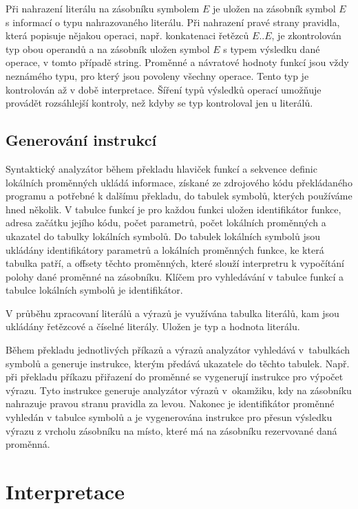 \documentclass[a4paper,11pt,titlepage]{article}
\begin{document}
Při nahrazení literálu na zásobníku symbolem $E$ je uložen na zásobník symbol $E$ s informací o typu nahrazovaného literálu.
Při nahrazení pravé strany pravidla, která popisuje nějakou operaci, např. konkatenaci řetězců $E .. E$, je zkontrolován typ obou operandů a na zásobník uložen symbol $E$ s typem výsledku dané operace, v tomto případě string. Proměnné a návratové hodnoty funkcí jsou vždy neznámého typu, pro který jsou povoleny všechny operace. Tento typ je kontrolován až v době interpretace. Šíření typů výsledků operací umožňuje provádět rozsáhlejší kontroly, než kdyby se typ kontroloval jen u literálů.

\subsection{Generování instrukcí}

Syntaktický analyzátor během překladu hlaviček funkcí a sekvence definic lo\-kál\-ních proměnných ukládá informace, získané ze zdrojového kódu pře\-klá\-da\-ného programu a potřebné k dalšímu překladu, do tabulek symbolů, kterých používáme hned několik. V tabulce funkcí je pro každou funkci uložen identifikátor funkce, adresa začátku jejího kódu, počet parametrů, počet lokálních pro\-měn\-ných a ukazatel do tabulky lokálních symbolů. Do tabulek lokálních symbolů jsou ukládány identifikátory parametrů a lokálních proměnných funkce, ke která tabulka patří, a offsety těchto proměnných, které slouží interpretru k vypočítání polohy dané proměnné na zásobníku. Klíčem pro vyhledávání v tabulce funkcí a tabulce lokálních symbolů je identifikátor.

V průběhu zpracovaní literálů a výrazů je využívána tabulka literálů, kam jsou ukládány řetězcové a číselné  literály. Uložen je typ a hodnota literálu.

Během překladu jednotlivých příkazů a výrazů analyzátor vyhledává v~tabulkách symbolů a generuje instrukce, kterým předává ukazatele do těchto tabulek. Např. při překladu příkazu přiřazení do proměnné se vygenerují instrukce pro výpočet výrazu. Tyto instrukce generuje analyzátor výrazů v~okamžiku, kdy na zásobníku nahrazuje pravou stranu pravidla za levou. Nakonec je identifikátor proměnné vyhledán v tabulce symbolů a je vygenerována instrukce pro přesun výsledku výrazu z vrcholu zásobníku na místo, které má na zásobníku rezervované daná proměnná.

\section{Interpretace}
\end{document}
